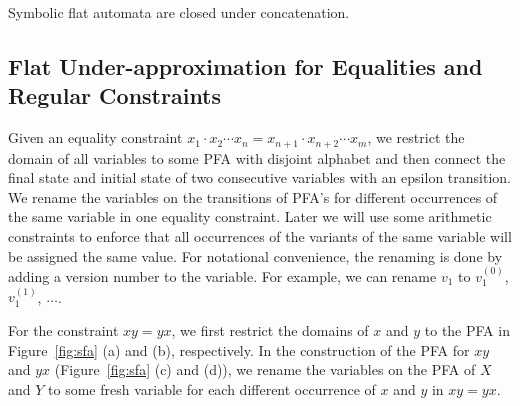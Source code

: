 \documentclass[sigplan,review,anonymous]{acmart}\settopmatter{printfolios=true,printccs=false,printacmref=false}
\begin{document}

\begin{lemma}
	Symbolic flat automata are closed under concatenation.
\end{lemma}






\subsection{Flat Under-approximation for Equalities and Regular Constraints} \label{section:eq}

Given an equality constraint $x_1\cdot x_2 \cdots x_n = x_{n+1}\cdot x_{n+2} \cdots x_m$, we restrict the domain of all variables to some PFA with disjoint alphabet and then connect the final state and initial state of two consecutive variables with an epsilon transition. We rename the variables on the transitions of PFA's for different occurrences of the same variable in one equality constraint. Later we will use some arithmetic constraints to enforce that all occurrences of the variants of the same variable will be assigned the same value. For notational convenience, the renaming is done by adding a version number to the variable. For example, we can rename $v_1$ to $v_1^{(0)}$, $v_1^{(1)}$, $\ldots$.

For the constraint $xy = yx$, we first restrict the domains of $x$ and $y$ to the PFA in Figure~\ref{fig:sfa} (a) and (b), respectively. In the construction of the PFA for $xy$ and $yx$ (Figure~\ref{fig:sfa} (c) and (d)), we rename the variables on the PFA of $X$ and $Y$ to some fresh variable for each different occurrence of $x$ and $y$ in $xy = yx$.
\end{document}

